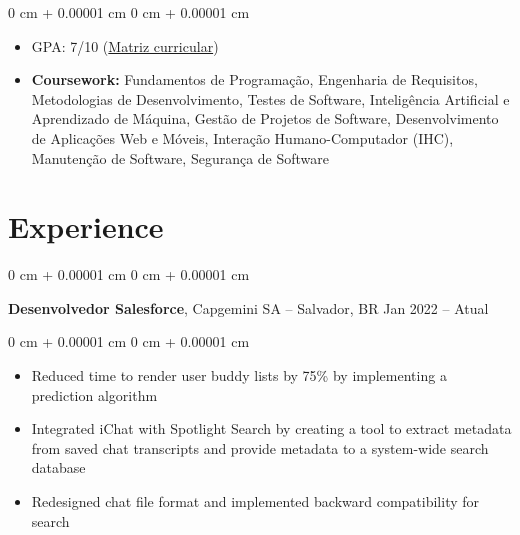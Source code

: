 \documentclass[10pt, letterpaper]{article}
\newenvironment{highlights}{
    \begin{itemize}[
        topsep=0.10 cm,
        parsep=0.10 cm,
        partopsep=0pt,
        itemsep=0pt,
        leftmargin=0 cm + 10pt
    ]
}{
    \end{itemize}
} %
\newenvironment{onecolentry}{
    \begin{adjustwidth}{
        0 cm + 0.00001 cm
    }{
        0 cm + 0.00001 cm
    }
}{
    \end{adjustwidth}
} %
\newenvironment{twocolentry}[2][]{
    \onecolentry
    \def\secondColumn{#2}
    \setcolumnwidth{\fill, 4.5 cm}
    \begin{paracol}{2}
}{
    \switchcolumn \raggedleft \secondColumn
    \end{paracol}
    \endonecolentry
} %
\begin{document}
        \vspace{0.10 cm}
        \begin{onecolentry}
            \begin{highlights}
                \item GPA: 7/10 (\href{https://inscricao.ucsal.br/wp-content/uploads/2023/09/MATRIZ-ENGENHARIA-DE-SOFTWARE-MATUTINO.pdf}{Matriz curricular})
                \item \textbf{Coursework:} Fundamentos de Programação, Engenharia de Requisitos, Metodologias de Desenvolvimento, Testes de Software, Inteligência Artificial e Aprendizado de Máquina, Gestão de Projetos de Software, Desenvolvimento de Aplicações Web e Móveis, Interação Humano-Computador (IHC), Manutenção de Software, Segurança de Software
            \end{highlights}
        \end{onecolentry}

        \vspace{0.10 cm}





    
    \section{Experience}



        
        \begin{twocolentry}{
            Jan 2022 – Atual
        }
            \textbf{Desenvolvedor Salesforce}, Capgemini SA -- Salvador, BR\end{twocolentry}

        \vspace{0.10 cm}
        \begin{onecolentry}
            \begin{highlights}
                \item Reduced time to render user buddy lists by 75\% by implementing a prediction algorithm
                \item Integrated iChat with Spotlight Search by creating a tool to extract metadata from saved chat transcripts and provide metadata to a system-wide search database
                \item Redesigned chat file format and implemented backward compatibility for search
            \end{highlights}
        \end{onecolentry}
\end{document}
